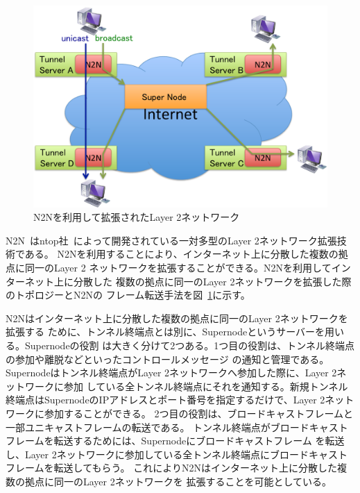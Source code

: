 \begin{figure}
	\begin{center}
		\includegraphics[scale=0.60]{./img/n2ntopology}
		\caption{N2Nを利用して拡張されたLayer 2ネットワーク}
		\label{img:n2ntopology}
	\end{center}
\end{figure}

N2N~\cite{n2n}はntop社~\cite{ntop}によって開発されている一対多型のLayer 2ネットワーク拡張技術である。
N2Nを利用することにより、インターネット上に分散した複数の拠点に同一のLayer 2
ネットワークを拡張することができる。N2Nを利用してインターネット上に分散した
複数の拠点に同一のLayer 2ネットワークを拡張した際のトポロジーとN2Nの
フレーム転送手法を図~\ref{img:n2ntopology}に示す。

N2Nはインターネット上に分散した複数の拠点に同一のLayer 2ネットワークを拡張する
ために、トンネル終端点とは別に、Supernodeというサーバーを用いる。Supernodeの役割
は大きく分けて2つある。1つ目の役割は、トンネル終端点の参加や離脱などといったコントロールメッセージ
の通知と管理である。Supernodeはトンネル終端点がLayer 2ネットワークへ参加した際に、Layer 2ネットワークに参加
している全トンネル終端点にそれを通知する。新規トンネル終端点はSupernodeのIPアドレスとポート番号を指定するだけで、Layer 2ネットワークに参加することができる。
2つ目の役割は、ブロードキャストフレームと一部ユニキャストフレームの転送である。
トンネル終端点がブロードキャストフレームを転送するためには、Supernodeにブロードキャストフレーム
を転送し、Layer 2ネットワークに参加している全トンネル終端点にブロードキャストフレームを転送してもらう。
これによりN2Nはインターネット上に分散した複数の拠点に同一のLayer 2ネットワークを
拡張することを可能としている。

